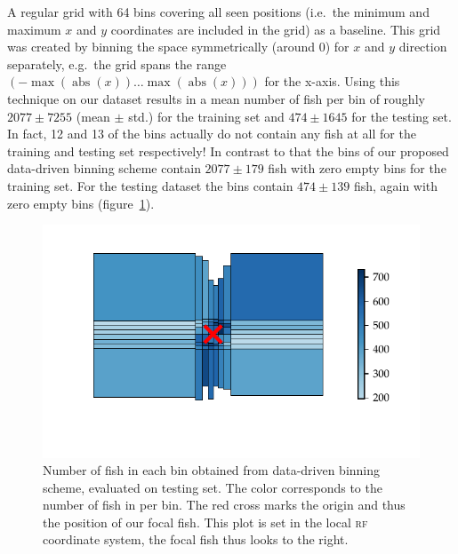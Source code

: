 \documentclass[nobib, a4paper]{tufte-handout}
\begin{document}
A regular grid with 64 bins covering all seen positions (i.e.\ the minimum and maximum $x$ and $y$ coordinates are included in the grid) as a baseline.
This grid was created by binning the space symmetrically (around 0) for $x$ and $y$ direction separately,
e.g.\ the grid spans the range $\left(  -\max(  \operatorname{abs}( x)) \ldots \max ( \operatorname{abs}( x)) \right)$ for the x-axis.
Using this technique on our dataset results in a mean number of fish per bin of roughly \(2077\pm 7255\) (mean $\pm$ std.) for the training set and \(474 \pm 1645\) for the testing set.
In fact, 12 and 13 of the bins actually do not contain any fish at all for the training and testing set respectively!
In contrast to that the bins of our proposed data-driven binning scheme contain $2077 \pm 179$ fish with zero empty bins for the training set.
For the testing dataset the bins contain $474 \pm 139$ fish, again with zero empty bins (figure~\ref{fig:occupancy}).

\begin{figure}[htb]
  \includegraphics{rf_occupancy_test}
   \centering
   \caption{Number of fish in each bin obtained from data-driven binning scheme, evaluated on testing set.
     The color corresponds to the number of fish in per bin.
     The red cross marks the origin and thus the position of our focal fish.
   This plot is set in the local \textsc{rf} coordinate system, the focal fish thus looks to the right.}
   \label{fig:occupancy}
\end{figure}
\end{document}
